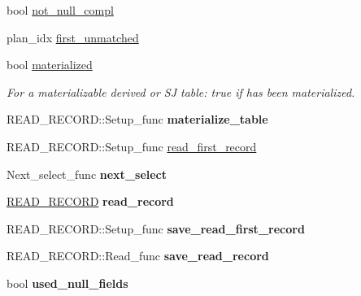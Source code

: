 \begin{DoxyCompactItemize}
\item 
bool \mbox{\hyperlink{classQEP__TAB_a4e9b5678ae69e56ca170ac87d035d309}{not\+\_\+null\+\_\+compl}}
\item 
plan\+\_\+idx \mbox{\hyperlink{classQEP__TAB_adf94604f65018483cf7aeb8eca0a7f44}{first\+\_\+unmatched}}
\item 
\mbox{\label{classQEP__TAB_a5f12b0c9e241a111d1236d73f232c18d}} 
bool \mbox{\hyperlink{classQEP__TAB_a5f12b0c9e241a111d1236d73f232c18d}{materialized}}
\begin{DoxyCompactList}\small\item\em For a materializable derived or SJ table\+: true if has been materialized. \end{DoxyCompactList}\item 
\mbox{\label{classQEP__TAB_a2ccdaa1be3f863cc8a749fb4bd154cd4}} 
R\+E\+A\+D\+\_\+\+R\+E\+C\+O\+R\+D\+::\+Setup\+\_\+func {\bfseries materialize\+\_\+table}
\item 
R\+E\+A\+D\+\_\+\+R\+E\+C\+O\+R\+D\+::\+Setup\+\_\+func \mbox{\hyperlink{classQEP__TAB_ac2ce8d99bd715a7459b1451786f1b07b}{read\+\_\+first\+\_\+record}}
\item 
\mbox{\label{classQEP__TAB_ab1574bc62df1d227b30feb11e1a387ff}} 
Next\+\_\+select\+\_\+func {\bfseries next\+\_\+select}
\item 
\mbox{\label{classQEP__TAB_a5d826aedafbde305a1cfbeeae8629c00}} 
\mbox{\hyperlink{structREAD__RECORD}{R\+E\+A\+D\+\_\+\+R\+E\+C\+O\+RD}} {\bfseries read\+\_\+record}
\item 
\mbox{\label{classQEP__TAB_a2ecceb1861b0bdcd5dc793a4fa7959c9}} 
R\+E\+A\+D\+\_\+\+R\+E\+C\+O\+R\+D\+::\+Setup\+\_\+func {\bfseries save\+\_\+read\+\_\+first\+\_\+record}
\item 
\mbox{\label{classQEP__TAB_a82c3af595b96b8480b7f30f1273160d0}} 
R\+E\+A\+D\+\_\+\+R\+E\+C\+O\+R\+D\+::\+Read\+\_\+func {\bfseries save\+\_\+read\+\_\+record}
\item 
\mbox{\label{classQEP__TAB_aec1849b6cf4dd1a423ff5bd3727d27cc}} 
bool {\bfseries used\+\_\+null\+\_\+fields}
\item 
\mbox{\label{classQEP__TAB_a9f04fc80793407a0c21f9109419da5a2}} 

\end{DoxyCompactItemize}
